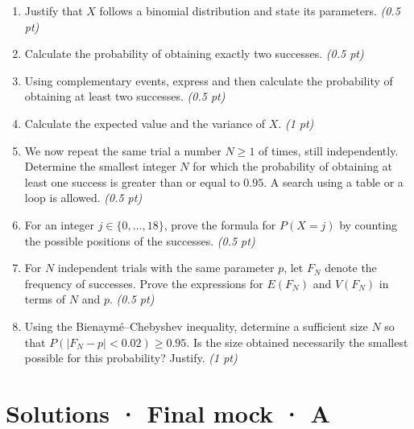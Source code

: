 \begin{enumerate}

\item Justify that $X$ follows a binomial distribution and state its parameters. \hfill\textit{(0.5 pt)}

\item Calculate the probability of obtaining exactly two successes. \hfill\textit{(0.5 pt)}

\item Using complementary events, express and then calculate the probability of obtaining at least two successes. \hfill\textit{(0.5 pt)}

\item Calculate the expected value and the variance of $X$. \hfill\textit{(1 pt)}

\item We now repeat the same trial a number $N\ge1$ of times, still independently. Determine the smallest integer $N$ for which the probability of obtaining at least one success is greater than or equal to $0.95$. A search using a table or a loop is allowed. \hfill\textit{(0.5 pt)}

\item For an integer $j\in\{0,\ldots,18\}$, prove the formula for $P(X=j)$ by counting the possible positions of the successes. \hfill\textit{(0.5 pt)}

\item For $N$ independent trials with the same parameter $p$, let $F_N$ denote the frequency of successes. Prove the expressions for $E(F_N)$ and $V(F_N)$ in terms of $N$ and $p$. \hfill\textit{(0.5 pt)}

\item Using the Bienaymé–Chebyshev inequality, determine a sufficient size $N$ so that $P(|F_N-p|<0.02)\ge0.95$. Is the size obtained necessarily the smallest possible for this probability? Justify. \hfill\textit{(1 pt)}

\end{enumerate}

\ifprof\clearpage

\section*{Solutions · Final mock · A}\label{cor:9-3}

